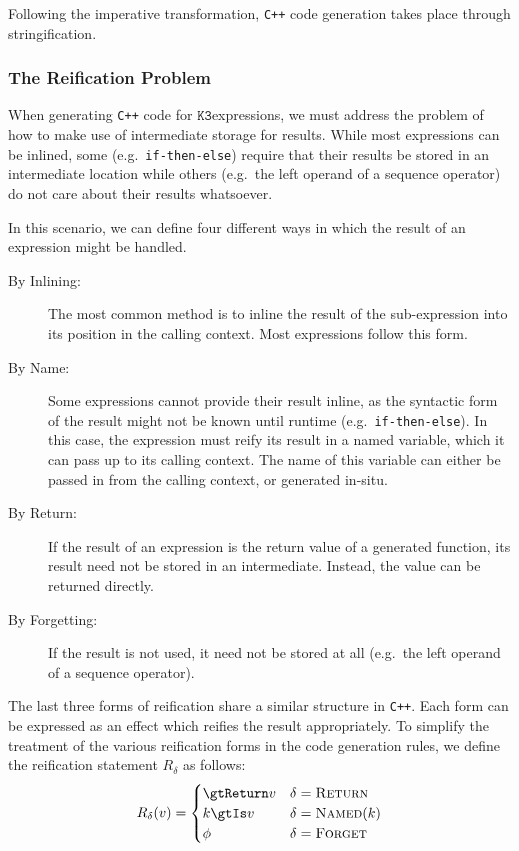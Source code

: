 \documentclass[10pt]{article}
\newcommand{\K}{\ensuremath{\texttt{K3}}}
\begin{document}
Following the imperative transformation, \texttt{C++} code generation takes place through
stringification.

\subsubsection{The Reification Problem}

When generating \texttt{C++} code for \K expressions, we must address the problem of
how to make use of intermediate storage for results. While most expressions can be inlined, some
(e.g.~\texttt{if-then-else}) require that their results be stored in an intermediate location
while others (e.g.~the left operand of a sequence operator) do not care about their results
whatsoever.

In this scenario, we can define four different ways in which the result of an expression might
be handled.

\begin{description}
    \item[By Inlining:] The most common method is to inline the result of the sub-expression
        into its position in the calling context. Most expressions follow this form.
    \item[By Name:] Some expressions cannot provide their result inline, as the syntactic form
        of the result might not be known until runtime (e.g.~\texttt{if-then-else}). In this
        case, the expression must reify its result in a named variable, which it can pass up to
        its calling context. The name of this variable can either be passed in from the calling
        context, or generated in-situ.
    \item[By Return:] If the result of an expression is the return value of a generated
        function, its result need not be stored in an intermediate. Instead, the value can be
        returned directly.
    \item[By Forgetting:] If the result is not used, it need not be stored at all (e.g.~the left
        operand of a sequence operator).
\end{description}

The last three forms of reification share a similar structure in \texttt{C++}. Each form can be
expressed as an effect which reifies the result appropriately. To simplify the treatment of the
various reification forms in the code generation rules, we define the reification statement
$R_\delta$ as follows:
%
\begin{align*}
    R_\delta(v) = \begin{cases}
        \gtReturn v & \delta = \textsc{Return} \\
        k \gtIs v & \delta = \textsc{Named$(k)$} \\
        \phi & \delta = \textsc{Forget}
    \end{cases}
\end{align*}
\end{document}
